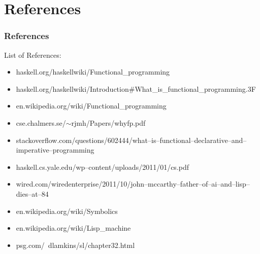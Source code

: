 \documentclass[presentation.tex]{subfiles}
\begin{document}
\section{References}
\begin{frame}
  \frametitle{References}
  List of References:
  \tiny
  \begin{itemize}
    \item haskell.org/haskellwiki/Functional\_programming
    \item haskell.org/haskellwiki/Introduction#What\_is\_functional\_programming.3F
    \item en.wikipedia.org/wiki/Functional\_programming
    \item cse.chalmers.se/$\sim$rjmh/Papers/whyfp.pdf
    \item stackoverflow.com/questions/602444/what--is--functional--declarative--and--imperative--programming
    \item haskell.cs.yale.edu/wp--content/uploads/2011/01/cs.pdf
    \item wired.com/wiredenterprise/2011/10/john--mccarthy--father--of--ai--and--lisp--dies--at--84
    \item en.wikipedia.org/wiki/Symbolics
    \item en.wikipedia.org/wiki/Lisp_machine
    \item psg.com/~dlamkins/sl/chapter32.html
  \end{itemize}
  \normalsize
\end{frame}
\end{document}
